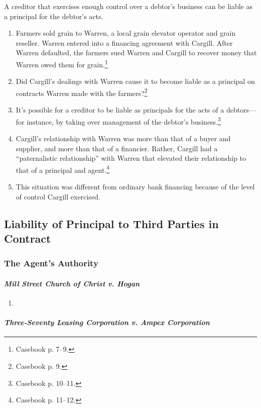 A creditor that exercises enough control over a debtor's business can be 
liable as a principal for the debtor's acts.

\begin{enumerate}
    \item Farmers sold grain to Warren, a local grain elevator operator and 
    grain reseller. Warren entered into a financing agreement with Cargill. 
    After Warren defaulted, the farmers sued Warren and Cargill to recover 
    money that Warren owed them for grain.\footnote{Casebook p. 7--9.}
    \item Did Cargill's dealings with Warren cause it to become liable as a 
    principal on contracts Warren made with the farmers?\footnote{Casebook p. 
    9.}
    \item It's possible for a creditor to be liable as principals for the acts 
    of a debtors---for instance, by taking over management of the debtor's 
    business.\footnote{Casebook p. 10--11.}
    \item Cargill's relationship with Warren was more than that of a buyer and 
    supplier, and more than that of a financier. Rather, Cargill had a 
    ``paternalistic relationship'' with Warren that elevated their 
    relationship to that of a principal and agent.\footnote{Casebook p. 
    11--12.}
    \item This situation was different from ordinary bank financing because of 
    the level of control Cargill exercised.
\end{enumerate}

\subsection{Liability of Principal to Third Parties in Contract}

\subsubsection{The Agent's Authority}

\paragraph{\emph{Mill Street Church of Christ v. Hogan}}

\begin{enumerate}
    \item %
\end{enumerate}

\paragraph{\emph{Three-Seventy Leasing Corporation v. Ampex Corporation}}

